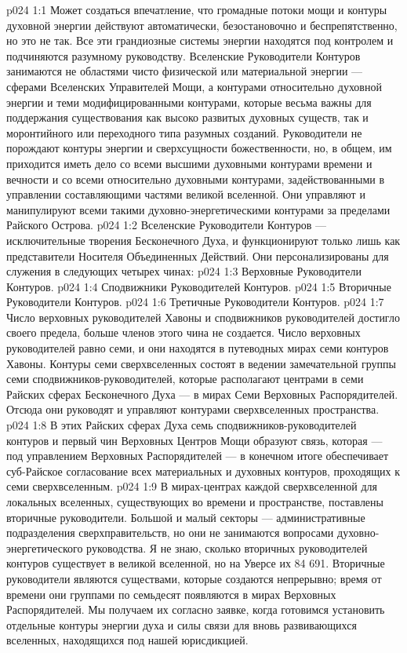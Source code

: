 \vs p024 1:1 Может создаться впечатление, что громадные потоки мощи и контуры духовной энергии действуют автоматически, безостановочно и беспрепятственно, но это не так. Все эти грандиозные системы энергии находятся под контролем и подчиняются разумному руководству. Вселенские Руководители Контуров занимаются не областями чисто физической или материальной энергии --- сферами Вселенских Управителей Мощи, а контурами относительно духовной энергии и теми модифицированными контурами, которые весьма важны для поддержания существования как высоко развитых духовных существ, так и моронтийного или переходного типа разумных созданий. Руководители не порождают контуры энергии и сверхсущности божественности, но, в общем, им приходится иметь дело со всеми высшими духовными контурами времени и вечности и со всеми относительно духовными контурами, задействованными в управлении составляющими частями великой вселенной. Они управляют и манипулируют всеми такими духовно\hyp{}энергетическими контурами за пределами Райского Острова.
\vs p024 1:2 \pc Вселенские Руководители Контуров --- исключительные творения Бесконечного Духа, и функционируют только лишь как представители Носителя Объединенных Действий. Они персонализированы для служения в следующих четырех чинах:
\vs p024 1:3 \bibnobreakspace Верховные Руководители Контуров.
\vs p024 1:4 \bibnobreakspace Сподвижники Руководителей Контуров.
\vs p024 1:5 \bibnobreakspace Вторичные Руководители Контуров.
\vs p024 1:6 \bibnobreakspace Третичные Руководители Контуров.
\vs p024 1:7 \pc Число верховных руководителей Хавоны и сподвижников руководителей достигло своего предела, больше членов этого чина не создается. Число верховных руководителей равно семи, и они находятся в путеводных мирах семи контуров Хавоны. Контуры семи сверхвселенных состоят в ведении замечательной группы семи сподвижников\hyp{}руководителей, которые располагают центрами в семи Райских сферах Бесконечного Духа --- в мирах Семи Верховных Распорядителей. Отсюда они руководят и управляют контурами сверхвселенных пространства.
\vs p024 1:8 В этих Райских сферах Духа семь сподвижников\hyp{}руководителей контуров и первый чин Верховных Центров Мощи образуют связь, которая --- под управлением Верховных Распорядителей --- в конечном итоге обеспечивает суб\hyp{}Райское согласование всех материальных и духовных контуров, проходящих к семи сверхвселенным.
\vs p024 1:9 В мирах\hyp{}центрах каждой сверхвселенной для локальных вселенных, существующих во времени и пространстве, поставлены вторичные руководители. Большой и малый секторы --- административные подразделения сверхправительств, но они не занимаются вопросами духовно\hyp{}энергетического руководства. Я не знаю, сколько вторичных руководителей контуров существует в великой вселенной, но на Уверсе их 84 691. Вторичные руководители являются существами, которые создаются непрерывно; время от времени они группами по семьдесят появляются в мирах Верховных Распорядителей. Мы получаем их согласно заявке, когда готовимся установить отдельные контуры энергии духа и силы связи для вновь развивающихся вселенных, находящихся под нашей юрисдикцией.
